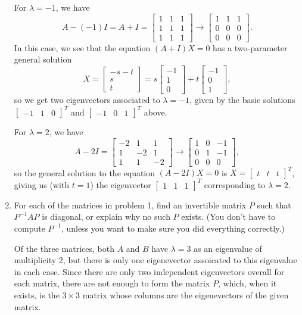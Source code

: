 \documentclass[12pt]{article}
\newcommand{\bbm}{\begin{bmatrix}}
\newcommand{\ebm}{\end{bmatrix}}
\begin{document}
\begin{enumerate}
For $\lambda = -1$, we have
\[
 A-(-1)I = A+I = \bbm 1&1&1\\1&1&1\\1&1&1\ebm \longrightarrow \bbm 1&1&1\\0&0&0\\0&0&0\ebm. 
\]
In this case, we see that the equation $(A+I)X=0$ has a two-parameter general solution 
\[
 X = \bbm -s-t\\s\\t\ebm = s\bbm -1\\1\\0\ebm + t\bbm -1\\0\\1\ebm,
\]
so we get two eigenvectors associated to $\lambda = -1$, given by the basic solutions $\bbm -1&1&0\ebm^T$ and $\bbm -1&0&1\ebm^T$ above.

For $\lambda = 2$, we have
\[
 A-2I = \bbm -2&1&1\\1&-2&1\\1&1&-2\ebm \longrightarrow \bbm 1&0&-1\\0&1&-1\\0&0&0\ebm,
\]
so the general solution to the equation $(A-2I)X=0$ is $X=\bbm t&t&t\ebm^T$, giving us (with $t=1$) the eigenvector $\bbm 1&1&1\ebm^T$ corresponding to $\lambda =2$.


\item For each of the matrices in problem 1, find an invertible matrix $P$ such that $P^{-1}AP$ is diagonal, or explain why no such $P$ exists. (You don't have to compute $P^{-1}$, unless you want to make sure you did everything correctly.)

\bigskip

Of the three matrices, both $A$ and $B$ have $\lambda=3$ as an eigenvalue of multiplicity 2, but there is only one eigenevector assoicated to this eigenvalue in each case. Since there are only two independent eigenvectors overall for each matrix, there are not enough to form the matrix $P$, which, when it exists, is the $3\times 3$ matrix whose columns are the eigenevectors of the given matrix.


\end{enumerate}
\end{document}
